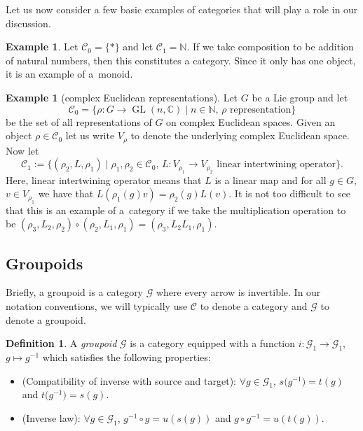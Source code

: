 \documentclass[10pt,a4paper]{amsart}
\numberwithin{equation}{section}
\theoremstyle{definition}
\newtheorem{Definition}[Theorem]{Definition}
\newtheorem{Example}[Theorem]{Example}
\newcommand{\BBC}{\mathbb{C}}
\newcommand{\BBN}{\mathbb{N}}
\newcommand{\CG}{\mathcal{G}}
\newcommand{\CC}{\mathcal{C}}
\newcommand{\inv}{^{-1}}
\DeclareMathOperator{\GL}{GL}
\begin{document}
Let us now consider a few basic examples of categories that will play a role in our discussion.
\begin{Example}
   Let $ \CC_0 = \{ * \} $ and let $ \CC_1 = \BBN $. If we take composition to be addition of natural numbers, then this constitutes a category. Since it only has one object, it is an example of a~monoid.
\end{Example}
\begin{Example}[complex Euclidean representations]
  Let $ G $ be a Lie group and let
  \[ \CC_0 = \{ \rho \colon G \to \GL(n,\BBC) \mid n \in \BBN,\, \rho \text{ representation} \} \]
   be the set of all representations of $ G $ on complex Euclidean spaces. Given an object $ \rho \in \CC_0 $ let us write $ V_\rho $ to denote the underlying complex Euclidean space. Now let
  \[ \CC_1 := \{ (\rho_2, L, \rho_1) \mid \rho_1, \rho_2 \in \CC_0, \, L \colon V_{\rho_1} \to V_{\rho_2} \text{ linear intertwining operator} \}. \]
  Here, linear intertwining operator means that $ L $ is a linear map and for all $ g \in G $, $ v \in V_{\rho_1} $ we have that
  $ L(\rho_1(g) v) = \rho_2(g) L(v)$.
  It is not too difficult to see that this is an example of a~category if we take the multiplication operation to be
 $(\rho_3, L_2, \rho_2) \circ (\rho_2, L_1, \rho_1 ) = (\rho_3, L_2 L_1, \rho_1 )$.
\end{Example}


\subsection{Groupoids}
Briefly, a groupoid is a category $ \CG $ where every arrow is invertible. In our notation conventions, we will typically use $ \CC $ to denote a category and $ \CG $ to denote a groupoid.
\begin{Definition}
A \emph{groupoid} $ \CG $ is a category equipped with a function
$i \colon \CG_1 \to \CG_1$, $g \mapsto g\inv$
which satisfies the following properties:
\begin{itemize}\itemsep=0pt
  \item (Compatibility of inverse with source and target):
  $\forall g \in \CG_1$, $ s\big(g\inv\big) = t(g)$ and \linebreak $t\big(g\inv\big) = s(g)$.
  \item (Inverse law):
  $\forall g \in \CG_1$, $ g\inv \circ g = u(s(g))$ and $g \circ g\inv = u(t(g))$.
\end{itemize}
\end{Definition}
\end{document}
